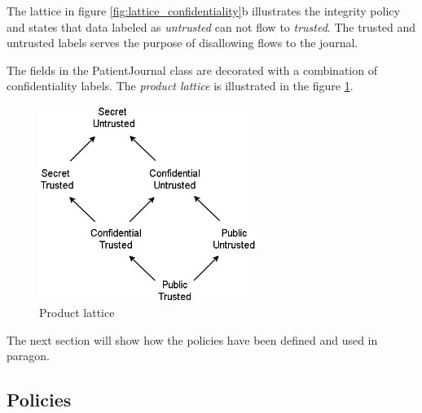 The lattice in figure \ref{fig:lattice_confidentiality}b illustrates the integrity policy and states that data labeled as \emph{untrusted} can not flow to \emph{trusted}. The trusted and untrusted labels serves the purpose of disallowing flows to the journal.

The fields in the PatientJournal class are decorated with a combination of confidentiality labels. The \emph{product lattice} is illustrated in the figure \ref{fig:lattice_product}.

\begin{figure}[H] 
	\centering
	\includegraphics[width=7cm]{figures/lattice_product.png}
	\caption{Product lattice}
	\label{fig:lattice_product}
\end{figure}


The next section will show how the policies have been defined and used in paragon. 



\subsection{Policies}\label{policies} 







